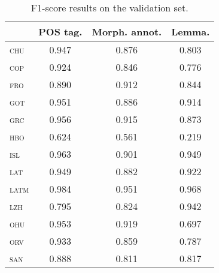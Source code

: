 \documentclass{../acl_latex.tex}
\begin{document}
\begin{table}[t]
\centering
\begin{tabular}{lccc}
\toprule
                 & POS tag. & Morph. annot. & Lemma. \\ \midrule
\textsc{chu}     &  0.947   &  0.876        & 0.803  \\ 
\textsc{cop}     &  0.924   &  0.846        & 0.776  \\ 
\textsc{fro}     &  0.890   &  0.912        & 0.844  \\
\textsc{got}     &  0.951   &  0.886        & 0.914  \\
\textsc{grc}     &  0.956   &  0.915        & 0.873  \\
\textsc{hbo}     &  0.624   &  0.561        & 0.219  \\
\textsc{isl}     &  0.963   &  0.901        & 0.949  \\
\textsc{lat}     &  0.949   &  0.882        & 0.922  \\
\textsc{latm}    &  0.984   &  0.951        & 0.968  \\
\textsc{lzh}     &  0.795   &  0.824        & 0.942  \\
\textsc{ohu}     &  0.953   &  0.919        & 0.697  \\
\textsc{orv}     &  0.933   &  0.859        & 0.787  \\
\textsc{san}     &  0.888   &  0.811        & 0.817  \\ \bottomrule 
\end{tabular}
\caption{
    F1-score results on the validation set.
}
\label{table:validation_results}
\end{table}
\end{document}
